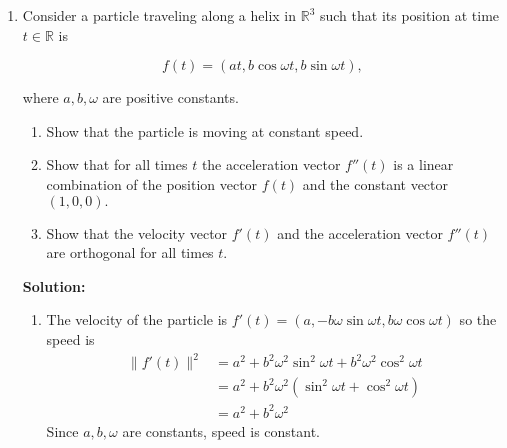 \documentclass{report}
\newcommand{\solution}{\textbf{Solution: }}
\begin{document}
\begin{enumerate}
\begin{enumerate}
			\smallskip
			\item
			Write down an integral whose value is the distance traveled by the 
			particle between time $t=-1$ and time $t=1.$ (You need not evaluate 
			your integral, but I will be impressed if you do).
			
		\end{enumerate}
	
	\solution
	\begin{enumerate}
		\item 
		The velocity is $f'(t) = (2t, 3t^2)$ 
		and the speed is 
		\[
			\|f'(t)\| =
			\sqrt{(2t)^2 + (3t^2)^2} =
			\sqrt{4t^2 + 9t^4}
		\]

		\item 
		$2t = 0$ and $3t^2 = 0$ only have a solution at $t=0$,
		so the velocity is only zero when $t=0$.
		Since $f''(t) = (2, 6t)$,
		the acceleration is $f''(0) = (2, 0)$.

		\item 
		The integral is 
		\[
			\int_{-1}^1 \sqrt{4t^2 + 9t^4} \,dt
		\]
	\end{enumerate}

	\medskip
	\item
	Consider a particle traveling along a helix in $\mathbb{R}^3$ such that its position 
	at time $t\in \mathbb{R}$ is 
	
		\begin{equation*}
			f(t) = (at,b\cos \omega t, b\sin \omega t),
		\end{equation*}
	
	
	\noindent
	where $a,b,\omega$ are positive constants.
	
		\begin{enumerate}
		
			\smallskip
			\item
			Show that the particle is moving at constant speed.
			
			\smallskip
			\item
			Show that for all times $t$ the acceleration vector $f''(t)$
			is a linear combination of the position vector $f(t)$ and the 
			constant vector $(1,0,0).$
			
			\smallskip
			\item
			Show that the velocity vector $f'(t)$ and the acceleration 
			vector $f''(t)$ are orthogonal for all times $t$.
		
		\end{enumerate}
	\solution 
	\begin{enumerate}
		\item 
		The velocity of the particle is
		$f'(t) = (a, -b\omega\sin\omega t, b\omega\cos\omega t)$
		so the speed is 
		\begin{align*}
			\|f'(t)\|^2
			&= a^2 + b^2\omega^2\sin^2\omega t + b^2\omega^2\cos^2\omega t \\
			&= a^2 + b^2\omega^2(\sin^2\omega t + \cos^2\omega t) \\
			&= a^2 + b^2\omega^2
		\end{align*}
		Since $a,b,\omega$ are constants, speed is constant.


\end{enumerate}
\end{enumerate}
\end{document}
